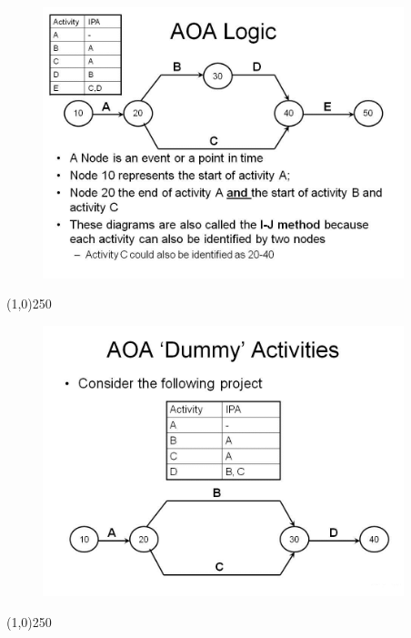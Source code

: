 \begin{frame}
\begin{figure}
	\centering
		\includegraphics[width = 10.5cm]{oldnotes/Slide49.jpg}
\end{figure}
\end{frame}
\begin{center}\line(1,0){250}\end{center}





\begin{frame}
\begin{figure}
	\centering
		\includegraphics[width = 10.5cm]{oldnotes/Slide50.jpg}
\end{figure}
\end{frame}
\begin{center}\line(1,0){250}\end{center}





